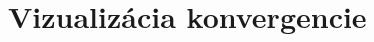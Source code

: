 \documentclass[report.tex]{subfiles}
\begin{document}
\section{Vizualizácia konvergencie}\label{sec:EF}
\end{document}
